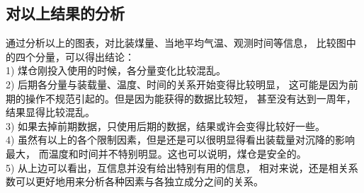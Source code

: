 \subsection{对以上结果的分析}
通过分析以上的图表，对比装煤量、当地平均气温、观测时间等信息，
比较图中的四个分量，可以得出结论：\\
    1) 煤仓刚投入使用的时候，各分量变化比较混乱。\\
    2) 后期各分量与装载量、温度、时间的关系开始变得比较明显，
	这可能是因为前期的操作不规范引起的。但是因为能获得的数据比较短，
	甚至没有达到一周年，结果显得比较混乱。\\
    3) 如果去掉前期数据，只使用后期的数据，结果或许会变得比较好一些。\\
    4) 虽然有以上的各个限制因素，但是还是可以很明显得看出装载量对沉降的影响最大，
	而温度和时间并不特别明显。这也可以说明，煤仓是安全的。\\
    5) 从上边可以看出，互信息并没有给出特别有用的信息，
	相对来说，还是相关系数可以更好地用来分析各种因素与各独立成分之间的关系。\\













